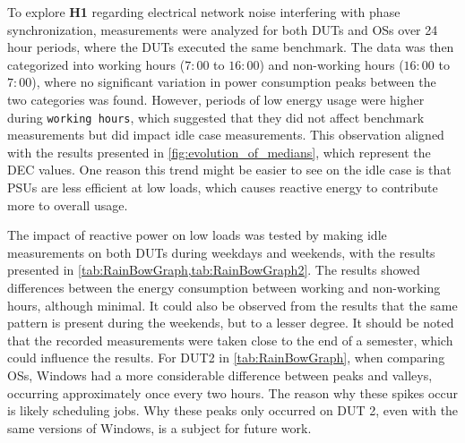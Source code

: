 

To explore \textbf{H1} regarding electrical network noise interfering with phase synchronization, measurements were analyzed for both DUTs and OSs over 24 hour periods, where the DUTs executed the same benchmark. The data was then categorized into working hours ($7:00$ to $16:00$) and non-working hours ($16:00$ to $7:00$), where no significant variation in power consumption peaks between the two categories was found. However, periods of low energy usage were higher during \texttt{working hours}, which suggested that they did not affect benchmark measurements but did impact idle case measurements. This observation aligned with the results presented in \cref{fig:evolution_of_medians}, which represent the DEC values. One reason this trend might be easier to see on the idle case is that PSUs are less efficient at low loads, which causes reactive energy to contribute more to overall usage.\cite{PowerSupply} 



The impact of reactive power on low loads was tested by making idle measurements on both DUTs during weekdays and weekends, with the results presented in  \cref{tab:RainBowGraph,tab:RainBowGraph2}. The results showed differences between the energy consumption between working and non-working hours, although minimal. It could also be observed from the results that the same pattern is present during the weekends, but to a lesser degree. It should be noted that the recorded measurements were taken close to the end of a semester, which could influence the results. For DUT2 in \cref{tab:RainBowGraph}, when comparing OSs, Windows had a more considerable difference between peaks and valleys, occurring approximately once every two hours. The reason why these spikes occur is likely scheduling jobs.%
Why these peaks only occurred on DUT 2, even with the same versions of Windows, is a subject for future work. 

